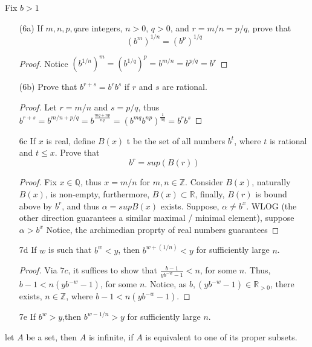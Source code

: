 \documentclass{amsart}
\numberwithin{equation}{section}
\theoremstyle{plain}
\theoremstyle{definition}
\begin{document}
Fix $b > 1$
\begin{enumerate}
  \item[(6a)] If $m,n,p,q$are integers, $n > 0$, $q > 0$, and $r = m/n = p/q$, prove that 
  \begin{equation}
    (b^m)^{1/n} = (b^p)^{1/q}
  \end{equation}
  \begin{proof}
    Notice $(b^{1/n})^m = (b^{1/q})^p = b^{m/n} = b^{p/q} = b^r$
  \end{proof}
  \item[(6b)] Prove that $b^{r + s} = b^r b^s$ if $r$ and $s$ are rational.
  \begin{proof}
    Let $r = m/n$ and $s = p/q$, thus $b^{r+s} = b^{m/n + p/q} = b^{\frac{mq + np}{nq}} = (b^{mq}b^{np})^{\frac{1}{nq}}=b^rb^s$
  \end{proof}
  \item[6c] If $x$ is real, define $B(x)$ t be the set of all numbers $b^t$, where $t$ is rational and $t \leq x$. 
  Prove that 
  \begin{equation}
    b^r = sup(B(r))
  \end{equation}
  \begin{proof}
    Fix $x \in \mathbb{Q}$, thus $x = m/n$ for $m,n \in \mathbb{Z}$. Consider $B(x)$, naturally $B(x)$, is non-empty,
    furthermore, $B(x) \subset \mathbb{R}$, finally, $B(r)$ is bound above by $b^r$, and thus $\alpha = sup B(x)$ exists.
    Suppose, $\alpha \not= b^x$. WLOG (the other direction guarantees a similar maximal / minimal element), suppose $\alpha > b^x$
    Notice, the archimedian proprty of real numbers guarantees
  \end{proof}
\end{enumerate}

\begin{enumerate}
  \item[7d] If $w$ is such that $b^w < y$, then $b^{w + (1/n)} < y$ for sufficiently large $n$.
  \begin{proof}
      Via $7c$, it suffices to show that $\frac{b - 1}{yb^{-w} -1} < n$, for some $n$. Thus, $b-1 < n(yb^{-w } -1)$, for some $n$.
      Notice, as $b, (yb^{-w} -1) \in \mathbb{R}_{>0}$, there exists, $n \in \mathbb{Z}$, where $b - 1 <  n(yb^{-w} - 1)$.
  \end{proof}
  \item[7e] If $b^w > y$,then $b^{w - 1/n} > y$ for sufficiently large $n$.
\end{enumerate}
let $A$ be a set, then $A$ is infinite, if $A$ is equivalent to one of its proper subsets.
\end{document}
